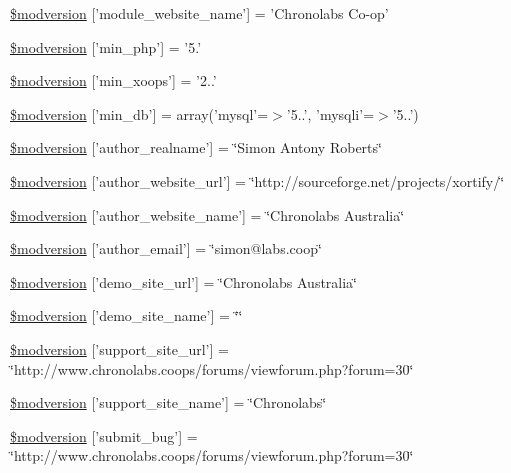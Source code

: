 \begin{DoxyCompactItemize}
\item 
\hyperlink{xoops__version_8php_a084df2399d3cc8c26eb02e88e08b622c}{\$modversion} \mbox{[}'module\-\_\-website\-\_\-name'\mbox{]} = 'Chronolabs Co-\/op'
\item 
\hyperlink{xoops__version_8php_af0bc7d0c4fe87fc42a2f15409ed68875}{\$modversion} \mbox{[}'min\-\_\-php'\mbox{]} = '5.'
\item 
\hyperlink{xoops__version_8php_a138065f75446a11b4d48364b1f17e788}{\$modversion} \mbox{[}'min\-\_\-xoops'\mbox{]} = '2..'
\item 
\hyperlink{xoops__version_8php_a1c2efd68629d51e54fb27c265f7805c9}{\$modversion} \mbox{[}'min\-\_\-db'\mbox{]} = array('mysql'=$>$'5..', 'mysqli'=$>$'5..')
\item 
\hyperlink{xoops__version_8php_a42cbe75464ce49a2d4b4021d2723d138}{\$modversion} \mbox{[}'author\-\_\-realname'\mbox{]} = \char`\"{}Simon Antony Roberts\char`\"{}
\item 
\hyperlink{xoops__version_8php_aa4e12581579c2367973edde1bb88501b}{\$modversion} \mbox{[}'author\-\_\-website\-\_\-url'\mbox{]} = \char`\"{}http\-://sourceforge.\-net/projects/xortify/\char`\"{}
\item 
\hyperlink{xoops__version_8php_a46166b6a7758f2db961ddfc222c7cee7}{\$modversion} \mbox{[}'author\-\_\-website\-\_\-name'\mbox{]} = \char`\"{}Chronolabs Australia\char`\"{}
\item 
\hyperlink{xoops__version_8php_ab54848746dffc89a9586849773c37117}{\$modversion} \mbox{[}'author\-\_\-email'\mbox{]} = \char`\"{}simon@labs.\-coop\char`\"{}
\item 
\hyperlink{xoops__version_8php_ac4ba86acfbe5315b02336ae5b1bfda08}{\$modversion} \mbox{[}'demo\-\_\-site\-\_\-url'\mbox{]} = \char`\"{}Chronolabs Australia\char`\"{}
\item 
\hyperlink{xoops__version_8php_a791eeaa88e332857d66106842bea8dbe}{\$modversion} \mbox{[}'demo\-\_\-site\-\_\-name'\mbox{]} = \char`\"{}\char`\"{}
\item 
\hyperlink{xoops__version_8php_a641a463ee220e6308d212336ac3fc5d3}{\$modversion} \mbox{[}'support\-\_\-site\-\_\-url'\mbox{]} = \char`\"{}http\-://www.\-chronolabs.\-coops/forums/viewforum.\-php?forum=30\char`\"{}
\item 
\hyperlink{xoops__version_8php_abf96815bce17f25c7e7536bc71495ae1}{\$modversion} \mbox{[}'support\-\_\-site\-\_\-name'\mbox{]} = \char`\"{}Chronolabs\char`\"{}
\item 
\hyperlink{xoops__version_8php_af3e5bbed6b430087f78267070c0ac644}{\$modversion} \mbox{[}'submit\-\_\-bug'\mbox{]} = \char`\"{}http\-://www.\-chronolabs.\-coops/forums/viewforum.\-php?forum=30\char`\"{}

\end{DoxyCompactItemize}
